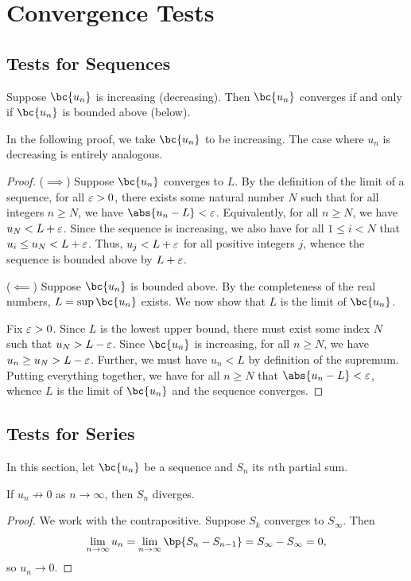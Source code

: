 \chapter{Convergence Tests}

\section{Tests for Sequences}\label{sec:convergence-sequence}

\begin{theorem}
    Suppose $\bc{u_n}$ is increasing (decreasing). Then $\bc{u_n}$ converges if and only if $\bc{u_n}$ is bounded above (below).
\end{theorem}
In the following proof, we take $\bc{u_n}$ to be increasing. The case where $u_n$ is decreasing is entirely analogous.
\begin{proof}
    ($\implies$) Suppose $\bc{u_n}$ converges to $L$. By the definition of the limit of a sequence, for all $\varepsilon > 0$, there exists some natural number $N$ such that for all integers $n \geq N$, we have $\abs{u_n - L} < \ve$. Equivalently, for all $n \geq N$, we have $u_N < L + \varepsilon$. Since the sequence is increasing, we also have for all $1 \leq i < N$ that $u_i \leq u_N < L + \varepsilon$. Thus, $u_j < L + \varepsilon$ for all positive integers $j$, whence the sequence is bounded above by $L + \varepsilon$.
    
    ($\impliedby$) Suppose $\bc{u_n}$ is bounded above. By the completeness of the real numbers, $L = \sup \bc{u_n}$ exists. We now show that $L$ is the limit of $\bc{u_n}$.
    
    Fix $\varepsilon > 0$. Since $L$ is the lowest upper bound, there must exist some index $N$ such that $u_N > L - \varepsilon$. Since $\bc{u_n}$ is increasing, for all $n \geq N$, we have $u_n \geq u_N > L - \varepsilon$. Further, we must have $u_n < L$ by definition of the supremum. Putting everything together, we have for all $n \geq N$ that $\abs{u_n - L} < \ve$, whence $L$ is the limit of $\bc{u_n}$ and the sequence converges.
\end{proof}

\section{Tests for Series}\label{sec:convergence-series}

In this section, let $\bc{u_n}$ be a sequence and $S_n$ its $n$th partial sum.

\begin{proposition}
    If $u_n \not\to 0$ as $n \to \infty$, then $S_n$ diverges.
\end{proposition}
\begin{proof}
    We work with the contrapositive. Suppose $S_k$ converges to $S_{\infty}$. Then \[\lim_{n \to \infty} u_n = \lim_{n \to \infty} \bp{S_{n} - S_{n-1}} = S_{\infty} - S_{\infty} = 0,\] so $u_n \to 0$.
\end{proof}

